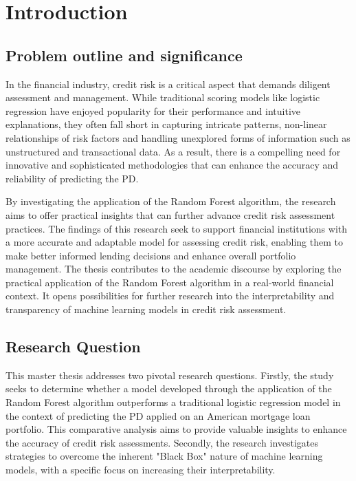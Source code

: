 \chapter{Introduction}
\section{Problem outline and significance}

In the financial industry, credit risk is a critical aspect that demands diligent assessment and management. While traditional scoring models like logistic regression have enjoyed popularity for their performance and intuitive explanations, they often fall short in capturing intricate patterns, non-linear relationships of risk factors and handling unexplored forms of information such as unstructured and transactional data. As a result, there is a compelling need for innovative and sophisticated methodologies that can enhance the accuracy and reliability of predicting the \ac{PD}.

By investigating the application of the Random Forest algorithm, the research aims to offer practical insights that can further advance credit risk assessment practices. The findings of this research seek to support financial institutions with a more accurate and adaptable model for assessing credit risk, enabling them to make better informed lending decisions and enhance overall portfolio management. The thesis contributes to the academic discourse by exploring the practical application of the Random Forest algorithm in a real-world financial context. It opens possibilities for further research into the interpretability and transparency of machine learning models in credit risk assessment.

\section{Research Question}

This master thesis addresses two pivotal research questions. Firstly, the study seeks to determine whether a model developed through the application of the Random Forest algorithm outperforms a traditional logistic regression model in the context of predicting the \ac{PD} applied on an American mortgage loan portfolio. This comparative analysis aims to provide valuable insights to enhance the accuracy of credit risk assessments. Secondly, the research investigates strategies to overcome the inherent "Black Box" nature of machine learning models, with a specific focus on increasing their interpretability. 

